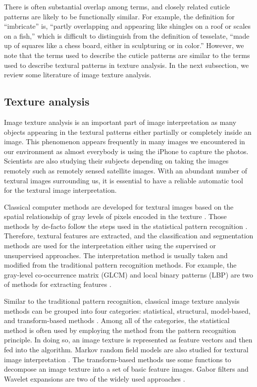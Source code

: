 \documentclass{aci}
\numberwithin{equation}{section}
\begin{document}
There is often substantial overlap among terms, and closely related cuticle
patterns are likely to be functionally similar. For example, the definition for
“imbricate” is, “partly overlapping and appearing like shingles on a roof or
scales on a fish,” which is difficult to distinguish from the definition of
tesselate, “made up of squares like a chess board, either in sculpturing or in
color.” However, we note that the terms used to describe the cuticle patterns
are similar to the terms used to describe textural patterns in texture analysis.
In the next subsection, we review some literature of image texture analysis.

\subsection{Texture analysis}

Image texture analysis is an important part of image interpretation as many
objects appearing in the textural patterns either partially or completely inside
an image. This phenomenon appears frequently in many images we encountered in
our environment as almost everybody is using the iPhone to capture the photos.
Scientists are also studying their subjects depending on taking the images
remotely such as remotely sensed satellite images. With an abundant number of
textural images surrounding us, it is essential to have a reliable automatic
tool for the textural image interpretation.

Classical computer methods are developed for textural images based on the
spatial relationship of gray levels of pixels encoded in the texture
\cite{haralick_image_1985,hung_image_2019}. Those methods by de-facto follow the
steps used in the statistical pattern recognition
\cite{fukunaga_introduction_2013}. Therefore, textural features are extracted,
and the classification and segmentation methods are used for the interpretation
either using the supervised or unsupervised approaches. The interpretation
method is usually taken and modified from the traditional pattern recognition
methods. For example, the gray-level co-occurrence matrix (GLCM) and local
binary patterns (LBP) are two of methods for extracting features
\cite{haralick_textural_1973, goos_gray_2000}.

Similar to the traditional pattern recognition, classical image texture analysis
methods can be grouped into four categories: statistical, structural,
model-based, and transform-based methods \cite{bharati_image_2004}. Among all of
the categories, the statistical method is often used by employing the method
from the pattern recognition principle.  In doing so, an image texture is
represented as feature vectors and then fed into the algorithm. Markov random
field models are also studied for textural image interpretation
\cite{hassner_use_1981, cross_markov_1983}. The transform-based methods use some functions to
decompose an image texture into a set of basic feature images. Gabor filters and
Wavelet expansions are two of the widely used approaches
\cite{bovik_multichannel_1990}.
\end{document}
